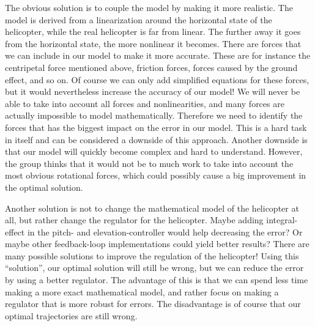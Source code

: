 \documentclass[../main.tex]{subfiles}
\begin{document}
The obvious solution is to couple the model by making it more realistic. The model is derived from a linearization around the horizontal state of the helicopter, while the real helicopter is far from linear. The further away it goes from the horizontal state, the more nonlinear it becomes. There are forces that we can include in our model to make it more accurate. These are for instance the centripetal force mentioned above, friction forces, forces caused by the ground effect, and so on. Of course we can only add simplified equations for these forces, but it would nevertheless increase the accuracy of our model! We will never be able to take into account all forces and nonlinearities, and many forces are actually impossible to model mathematically. Therefore we need to identify the forces that has the biggest impact on the error in our model. This is a hard task in itself and can be considered a downside of this approach. Another downside is that our model will quickly become complex and hard to understand. However, the group thinks that it would not be to much work to take into account the most obvious rotational forces, which could possibly cause a big improvement in the optimal solution.

Another solution is not to change the mathematical model of the helicopter at all, but rather change the regulator for the helicopter. Maybe adding integral-effect in the pitch- and elevation-controller would help decreasing the error? Or maybe other feedback-loop implementations could yield better results? There are many possible solutions to improve the regulation of the helicopter! Using this ``solution'', our optimal solution will still be wrong, but we can reduce the error by using a better regulator. The advantage of this is that we can spend less time making a more exact mathematical model, and rather focus on making a regulator that is more robust for errors. The disadvantage is of course that our optimal trajectories are still wrong.
\end{document}
